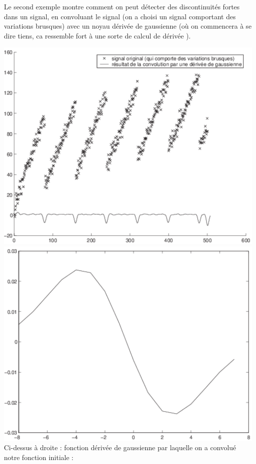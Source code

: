 \begin{example}
Le second exemple montre comment on peut détecter des discontinuités
fortes dans un signal, en convoluant le signal (on a choisi un signal
comportant des variations brusques) avec un noyau { dérivée de
gaussienne } (où on commencera à se dire { tiens, ca ressemble fort à
une sorte de calcul de dérivée }).

\includegraphics[scale=0.38]{con4.pdf} \includegraphics[scale=0.38]{con5.pdf} 
Ci-dessus à droite : fonction { dérivée de gaussienne } par laquelle on a convolué notre fonction initiale :
\end{example}

